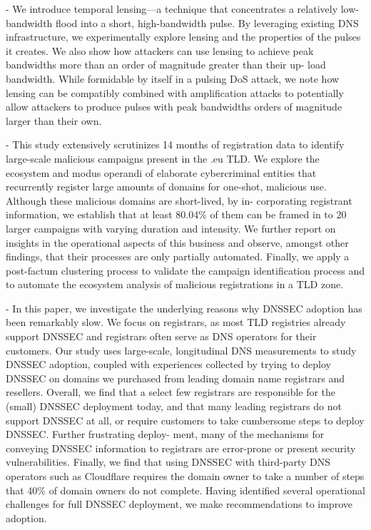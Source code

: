 \cite{rasti2015temporal} - We introduce temporal lensing—a technique that concentrates a relatively low-bandwidth flood into a short, high-bandwidth pulse. By leveraging existing DNS infrastructure, we experimentally explore lensing and the properties of the pulses it creates. We also show how attackers can use lensing to achieve peak bandwidths more than an order of magnitude greater than their up- load bandwidth. While formidable by itself in a pulsing DoS attack, we note how lensing can be compatibly combined with amplification attacks to potentially allow attackers to produce pulses with peak bandwidths orders of magnitude larger than their own.

\cite{vissers2017exploring} - This study extensively scrutinizes 14 months of registration data to identify large-scale malicious campaigns present in the .eu TLD. We explore the ecosystem and modus operandi of elaborate cybercriminal entities that recurrently register large amounts of domains for one-shot, malicious use. Although these malicious domains are short-lived, by in- corporating registrant information, we establish that at least 80.04\% of them can be framed in to 20 larger campaigns with varying duration and intensity. We further report on insights in the operational aspects of this business and observe, amongst other findings, that their processes are only partially automated. Finally, we apply a post-factum clustering process to validate the campaign identification process and to automate the ecosystem analysis of malicious registrations in a TLD zone.

\cite{chung2017understanding} - In this paper, we investigate the underlying reasons why DNSSEC adoption has been remarkably slow. We focus on registrars, as most TLD registries already support DNSSEC and registrars often serve as DNS operators for their customers. Our study uses large-scale, longitudinal DNS measurements to study DNSSEC adoption, coupled with experiences collected by trying to deploy DNSSEC on domains we purchased from leading domain name registrars and resellers. Overall, we find that a select few registrars are responsible for the (small) DNSSEC deployment today, and that many leading registrars do not support DNSSEC at all, or require customers to take cumbersome steps to deploy DNSSEC. Further frustrating deploy- ment, many of the mechanisms for conveying DNSSEC information to registrars are error-prone or present security vulnerabilities. Finally, we find that using DNSSEC with third-party DNS operators such as Cloudflare requires the domain owner to take a number of steps that 40\% of domain owners do not complete. Having identified several operational challenges for full DNSSEC deployment, we make recommendations to improve adoption.

